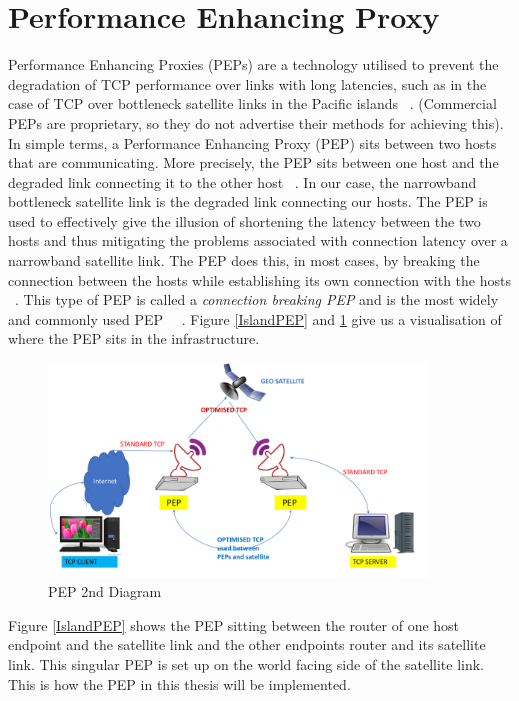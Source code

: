 \section{Performance Enhancing Proxy}\label{Proxy}
Performance Enhancing Proxies (PEPs) are a technology utilised to prevent the degradation of TCP performance over links with long latencies, such as in the case of TCP over bottleneck satellite links in the Pacific islands ~\cite{6}. (Commercial PEPs are proprietary, so they do not advertise their methods for achieving this). In simple terms, a Performance Enhancing Proxy (PEP) sits between two hosts that are communicating. More precisely, the PEP sits between one host and the degraded link connecting it to the other host ~\cite{6}. In our case, the narrowband bottleneck satellite link is the degraded link connecting our hosts. The PEP is used to effectively give the illusion of shortening the latency between the two hosts and thus mitigating the problems associated with connection latency over a narrowband satellite link. The PEP does this, in most cases, by breaking the connection between the hosts while establishing its own connection with the hosts ~\cite{14}. This type of PEP is called a \emph{connection breaking PEP} and is the most widely and commonly used PEP ~\cite{6}~\cite{14}. Figure \ref{IslandPEP} and \ref{DistributedPEP} give us a visualisation of where the PEP sits in the infrastructure.

\begin{figure}[h!]
    \centering
    \includegraphics[width=0.9\textwidth]{DistPEPs.pdf}
    \caption{PEP 2nd Diagram}
    \label{DistributedPEP}
\end{figure}

Figure \ref{IslandPEP} shows the PEP sitting between the router of one host endpoint and the satellite link and the other endpoints router and its satellite link. This singular PEP is set up on the world facing side of the satellite link. This is how the PEP in this thesis will be implemented.  \\

